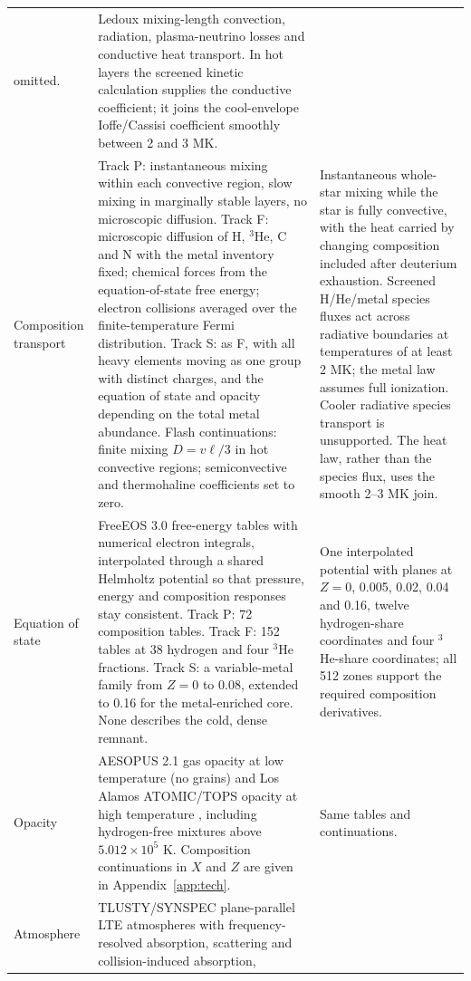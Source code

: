 {\begin{longtable}{@{}>{\raggedright\arraybackslash}p{}>{\raggedright\arraybackslash}p{}>{\raggedright\arraybackslash}p{}@{}}
omitted. & Ledoux mixing-length convection, radiation, plasma-neutrino
losses and conductive heat transport. In hot layers the screened kinetic
calculation supplies the conductive coefficient; it joins the cool-envelope
Ioffe/Cassisi coefficient smoothly between 2 and 3 MK. \\[4pt]
Composition transport & Track P: instantaneous mixing within each convective
region, slow mixing in marginally stable layers, no microscopic diffusion.
Track F: microscopic diffusion of H, $^3$He, C and N with the metal
inventory fixed; chemical forces from the equation-of-state free energy;
electron collisions averaged over the finite-temperature Fermi distribution.
Track S: as F, with all heavy elements moving as one group with distinct
charges, and the equation of state and opacity depending on the total metal
abundance. Flash continuations: finite mixing $D=v\ell/3$ in hot convective
regions; semiconvective and thermohaline coefficients set to zero.
& Instantaneous whole-star mixing while the star is fully convective, with
the heat carried by changing composition included after deuterium
exhaustion. Screened H/He/metal species fluxes act across radiative
boundaries at temperatures of at least 2 MK; the metal law assumes full
ionization. Cooler radiative species transport is unsupported.
The heat law, rather than the species flux, uses the smooth 2--3 MK join. \\[4pt]
Equation of state & FreeEOS 3.0 free-energy tables with numerical electron
integrals, interpolated through a shared Helmholtz potential so that
pressure, energy and composition responses stay consistent. Track P: 72
composition tables. Track F: 152 tables at 38 hydrogen and four $^3$He
fractions. Track S: a variable-metal family from $Z=0$ to 0.08, extended to
0.16 for the metal-enriched core. None describes the cold, dense remnant.
& One interpolated potential with planes at $Z=0$, 0.005, 0.02, 0.04 and
0.16, twelve hydrogen-share coordinates and four $^3$He-share coordinates;
all 512 zones support the required composition derivatives. \\[4pt]
Opacity & AESOPUS 2.1 gas opacity at low temperature (no grains) and Los
Alamos ATOMIC/TOPS opacity at high temperature \cite{colgan16,tops},
including hydrogen-free mixtures above $5.012\times10^5$ K. Composition
continuations in $X$ and $Z$ are given in Appendix~\ref{app:tech}.
& Same tables and continuations. \\[4pt]
Atmosphere & TLUSTY/SYNSPEC plane-parallel LTE atmospheres with
frequency-resolved absorption, scattering and collision-induced absorption,

\end{longtable}}
